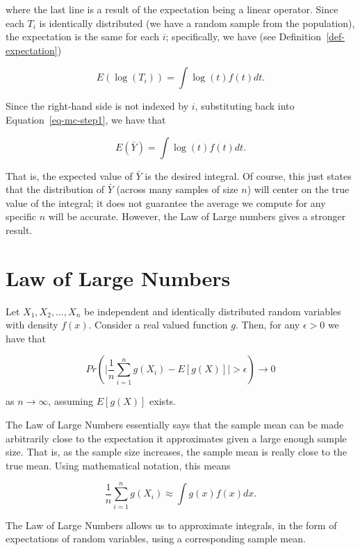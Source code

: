 \documentclass[
  letterpaper,
  DIV=11,
  numbers=noendperiod]{scrreprt}
\theoremstyle{definition}
\theoremstyle{definition}
\theoremstyle{plain}
\theoremstyle{remark}
\begin{document}
where the last line is a result of the expectation being a linear
operator. Since each \(T_i\) is identically distributed (we have a
random sample from the population), the expectation is the same for each
\(i\); specifically, we have (see Definition~\ref{def-expectation})

\[E\left(\log\left(T_i\right)\right) = \int \log(t) f(t) dt.\]

Since the right-hand side is not indexed by \(i\), substituting back
into Equation~\ref{eq-mc-step1}, we have that

\[E\left(\bar{Y}\right) = \int \log(t) f(t) dt.\]

That is, the expected value of \(\bar{Y}\) is the desired integral. Of
course, this just states that the distribution of \(\bar{Y}\) (across
many samples of size \(n\)) will center on the true value of the
integral; it does not guarantee the average we compute for any specific
\(n\) will be accurate. However, the Law of Large numbers gives a
stronger result.

\hypertarget{law-of-large-numbers}{%
\section{Law of Large Numbers}\label{law-of-large-numbers}}

Let \(X_1, X_2,\dotsc, X_n\) be independent and identically distributed
random variables with density \(f(x)\). Consider a real valued function
\(g\). Then, for any \(\epsilon > 0\) we have that

\[Pr\left(\lvert\frac{1}{n}\sum_{i=1}^n g\left(X_i\right) - E\left[g(X)\right]\rvert > \epsilon\right) \rightarrow 0\]

as \(n \rightarrow \infty\), assuming \(E\left[g(X)\right]\) exists.

The Law of Large Numbers essentially says that the sample mean can be
made arbitrarily close to the expectation it approximates given a large
enough sample size. That is, as the sample size increases, the sample
mean is really close to the true mean. Using mathematical notation, this
means

\[\frac{1}{n} \sum_{i=1}^{n} g\left(X_i\right) \approx \int g(x) f(x) dx.\]

\begin{tcolorbox}[enhanced jigsaw, leftrule=.75mm, coltitle=black, left=2mm, title=\textcolor{quarto-callout-tip-color}{\faLightbulb}\hspace{0.5em}{Big Idea}, breakable, toptitle=1mm, bottomtitle=1mm, colback=white, colbacktitle=quarto-callout-tip-color!10!white, titlerule=0mm, opacitybacktitle=0.6, colframe=quarto-callout-tip-color-frame, bottomrule=.15mm, arc=.35mm, opacityback=0, rightrule=.15mm, toprule=.15mm]

The Law of Large Numbers allows us to approximate integrals, in the form
of expectations of random variables, using a corresponding sample mean.

\end{tcolorbox}
\end{document}
